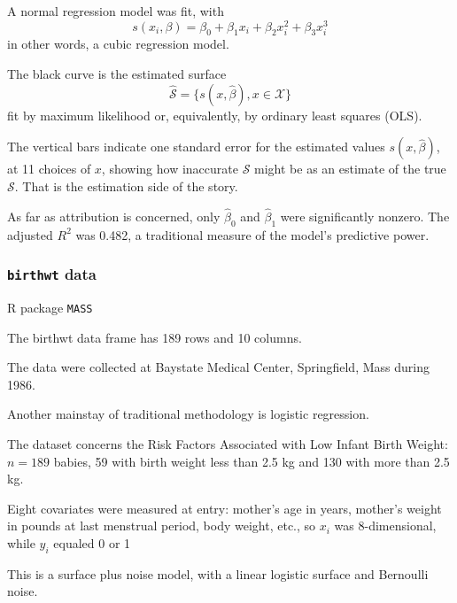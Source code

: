 \begin{frame}[fragile]

\bi
\item A normal regression model was fit, with
$$s(x_i,\beta)=\beta_0 + \beta_1 x_i + \beta_2 x_i^2 + \beta_3 x_i^3$$ in other words, a cubic regression model.
\item  The black curve is the
estimated surface
$$\hat{\mathcal{S}} = \{s(x,\hat{\beta}), x\in\mathcal{X}\}$$
fit by maximum likelihood or, equivalently, by ordinary least
squares (OLS). 
\item The vertical bars indicate one standard error
for the estimated values $s(x,\hat{\beta})$, at 11 choices of $x$, showing how
inaccurate $\hat{\mathcal{S}}$ might be as an estimate of the true $\mathcal{S}$. That is the estimation side of the story. 
\item As far as attribution
is concerned, only $\hat{\beta}_0$ and $\hat{\beta}_1$ were significantly nonzero. The
adjusted $R^2$ was 0.482, a traditional measure of the model’s
predictive power.
\ei

\end{frame}
\begin{frame}[fragile]\frametitle{\texttt{birthwt} data}

\bi
\item R package \texttt{MASS}
\item The birthwt data frame has 189 rows and 10 columns. 
\item The data were collected at Baystate Medical Center, Springfield, Mass during 1986.
\ei

\end{frame}
\begin{frame}[fragile]

\bi
\item Another mainstay of traditional methodology is logistic
regression. 
\item The dataset concerns the Risk Factors Associated with Low Infant Birth Weight: $n = 189$ babies, 59 with birth weight less than 2.5 kg and 130 with more than 2.5 kg.
\item Eight covariates were measured at entry: mother's age in years, mother's weight in pounds at last menstrual period, 
body weight, etc., so $x_i$ was 8-dimensional,
while $y_i$ equaled 0 or 1 
\item This is a surface plus noise model, with a linear logistic surface and Bernoulli
noise.
\ei

\end{frame}
